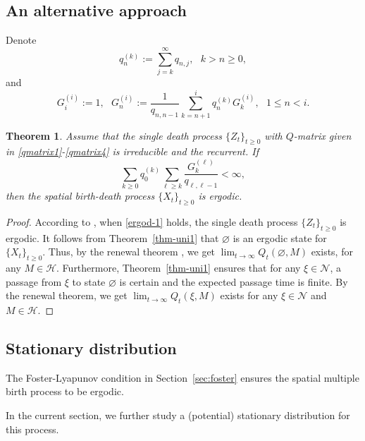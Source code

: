 \documentclass[12pt]{article}
\newtheorem{thm}{Theorem}[section]
\newcounter{con}%
\numberwithin{equation}{section}
\begin{document}
\subsection{An alternative approach}
Denote 
\begin{equation}
	q_n^{(k)}:=\sum_{j=k}^{\infty}q_{n,j},~~~k>n\ge0,
\end{equation}
and
\begin{equation}
	G_i^{(i)}:=1,~~~G_n^{(i)}:=\frac1{q_{n,n-1}}\sum_{k=n+1}^iq_n^{(k)}G_k^{(i)},~~~1\le n<i.
\end{equation}
\begin{thm}
	Assume that the single death process $\{Z_t\}_{t\ge0}$ with $Q$-matrix given in \eqref{qmatrix1}-\eqref{qmatrix4} is irreducible and the recurrent.
	If 
	\begin{equation}\label{ergod-1}
	\sum_{k\ge0}q_0^{(k)}\sum_{\ell\ge k}\frac{G_k^{(\ell)}}{q_{\ell,\ell-1}}<\infty,
\end{equation}
then the spatial birth-death process $\{X_t\}_{t\ge0}$ is ergodic. 
\end{thm}
\begin{proof}
	According to \cite[Theorem~1.1]{Zhang18}, when \eqref{ergod-1} holds, the single death process $\{Z_t\}_{t\ge0}$ is ergodic. It follows from Theorem~\ref{thm-uni1} that $\varnothing$ is an ergodic state for $\{X_t\}_{t\ge0}$. Thus, by the renewal theorem \cite[p.~379]{Feller71}, we get $\lim_{t\to\infty}Q_t(\varnothing,M)$ exists, for any $M\in\mathscr{H}$. Furthermore, Theorem~\ref{thm-uni1} ensures that for any $\xi\in\mathcal{N}$, a passage from $\xi$ to state $\varnothing$ is certain and the expected passage time is finite. By the renewal theorem, we get $\lim_{t\to\infty}Q_t(\xi,M)$ exists for any $\xi\in\mathcal{N}$ and $M\in\mathscr{H}$.
\end{proof}

\subsection{Stationary distribution}
The Foster-Lyapunov condition in Section~\ref{sec:foster} ensures the spatial multiple birth process to be ergodic. 

In the current section, we further study a (potential) stationary distribution for this process. 
\end{document}
